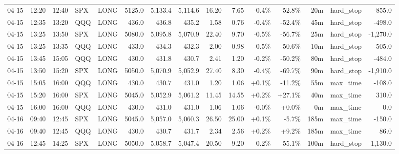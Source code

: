 \documentclass[11pt,a4paper,twoside]{article}
\begin{document}
\begin{landscape}
\begin{center}
\begin{longtable}{>{\color{txtmain}}l l l l l r r r r r r r r >{\color{txtmain}}l r}
04-15 & 12:20 & 12:40 & SPX & LONG & 5125.0 & 5,133.4 & 5,114.6 & 16.20 & 7.65 & \textcolor{lossred}{-0.4\%} & \textcolor{lossred}{-52.8\%} & 20m & hard\_stop & \textcolor{lossred}{-855.0} \\
04-15 & 12:35 & 13:20 & QQQ & LONG & 436.0 & 436.8 & 435.2 & 1.58 & 0.76 & \textcolor{lossred}{-0.4\%} & \textcolor{lossred}{-52.4\%} & 45m & hard\_stop & \textcolor{lossred}{-498.0} \\
04-15 & 13:25 & 13:50 & SPX & LONG & 5080.0 & 5,095.8 & 5,070.9 & 22.40 & 9.70 & \textcolor{lossred}{-0.5\%} & \textcolor{lossred}{-56.7\%} & 25m & hard\_stop & \textcolor{lossred}{-1,270.0} \\
04-15 & 13:25 & 13:35 & QQQ & LONG & 433.0 & 434.3 & 432.3 & 2.00 & 0.98 & \textcolor{lossred}{-0.5\%} & \textcolor{lossred}{-50.6\%} & 10m & hard\_stop & \textcolor{lossred}{-505.0} \\
04-15 & 13:45 & 15:05 & QQQ & LONG & 430.0 & 431.8 & 430.7 & 2.41 & 1.20 & \textcolor{lossred}{-0.2\%} & \textcolor{lossred}{-50.2\%} & 80m & hard\_stop & \textcolor{lossred}{-484.0} \\
04-15 & 13:50 & 15:20 & SPX & LONG & 5050.0 & 5,070.9 & 5,052.9 & 27.40 & 8.30 & \textcolor{lossred}{-0.4\%} & \textcolor{lossred}{-69.7\%} & 90m & hard\_stop & \textcolor{lossred}{-1,910.0} \\
04-15 & 15:05 & 16:00 & QQQ & LONG & 430.0 & 430.7 & 431.0 & 1.20 & 1.06 & \textcolor{wingreen}{+0.1\%} & \textcolor{lossred}{-11.2\%} & 55m & max\_time & \textcolor{lossred}{-108.0} \\
04-15 & 15:20 & 16:00 & SPX & LONG & 5045.0 & 5,052.9 & 5,061.2 & 11.45 & 14.55 & \textcolor{wingreen}{+0.2\%} & \textcolor{wingreen}{+27.1\%} & 40m & max\_time & \textcolor{wingreen}{310.0} \\
04-15 & 16:00 & 16:00 & QQQ & LONG & 430.0 & 431.0 & 431.0 & 1.06 & 1.06 & \textcolor{lossred}{-0.0\%} & \textcolor{wingreen}{+0.0\%} & 0m & max\_time & \textcolor{wingreen}{0.0} \\
04-16 & 09:40 & 12:45 & SPX & LONG & 5045.0 & 5,057.0 & 5,060.3 & 26.50 & 25.00 & \textcolor{wingreen}{+0.1\%} & \textcolor{lossred}{-5.7\%} & 185m & max\_time & \textcolor{lossred}{-150.0} \\
04-16 & 09:40 & 12:45 & QQQ & LONG & 430.0 & 430.7 & 431.7 & 2.34 & 2.56 & \textcolor{wingreen}{+0.2\%} & \textcolor{wingreen}{+9.2\%} & 185m & max\_time & \textcolor{wingreen}{86.0} \\
04-16 & 12:45 & 14:25 & SPX & LONG & 5050.0 & 5,058.7 & 5,047.4 & 20.50 & 9.20 & \textcolor{lossred}{-0.2\%} & \textcolor{lossred}{-55.1\%} & 100m & hard\_stop & \textcolor{lossred}{-1,130.0} \\

\end{longtable}
\end{center}
\end{landscape}
\end{document}

